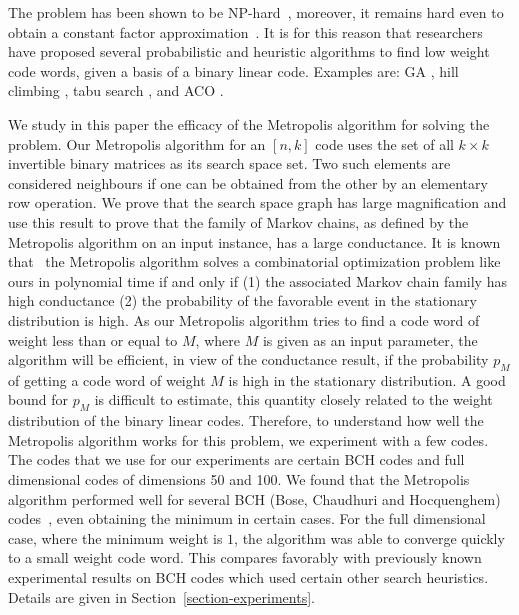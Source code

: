 \documentclass{sig-alternate-2013}
\begin{document}
The problem has been shown to be NP-hard~\cite{Elvin}, moreover, it
remains hard even to obtain a constant factor
approximation~\cite{Dumer}. It is for this reason that researchers
have proposed several probabilistic and heuristic algorithms to find
low weight code words, given a basis of a binary linear code. Examples
are: GA \cite{ref1, ref2, ref4}, hill climbing \cite{ref1,ref2, ref4},
tabu search \cite{ref3}, and ACO \cite{ant}.

We study in this paper the efficacy of the Metropolis algorithm for
solving the problem. Our Metropolis algorithm for an $[n,k]$ code uses
the set of all $k\times k$ invertible binary matrices as its search
space set. Two such elements are considered neighbours if one can be
obtained from the other by an elementary row operation. We prove that
the search space graph has large magnification and use this result to
prove that the family of Markov chains, as defined by the Metropolis
algorithm on an input instance, has a large conductance. It is known
that~\cite{Swagato} the Metropolis algorithm solves a combinatorial
optimization problem like ours in polynomial time if and only if (1)
the associated Markov chain family has high conductance (2) the
probability of the favorable event in the stationary distribution is
high. As our Metropolis algorithm tries to find a code word of weight
less than or equal to $M$, where $M$ is given as an input parameter,
the algorithm will be efficient, in view of the conductance result, if
the probability $p_M$ of getting a code word of weight $M$ is high in
the stationary distribution. A good bound for $p_M$ is difficult to
estimate, this quantity closely related to the weight distribution of
the binary linear codes. Therefore, to understand how well the
Metropolis algorithm works for this problem, we experiment with a few
codes. The codes that we use for our experiments are certain BCH codes
and full dimensional codes of dimensions 50 and 100.  We found that
the Metropolis algorithm performed well for several 
BCH (Bose, Chaudhuri and Hocquenghem) codes~\cite{bch}, even
obtaining the minimum in certain cases.  For the full dimensional
case, where the minimum weight is $1$, the algorithm was able to
converge quickly to a small weight code word. This compares favorably
with previously known experimental results on BCH codes which used
certain other search heuristics. Details are given in
Section~\ref{section-experiments}.
\end{document}

